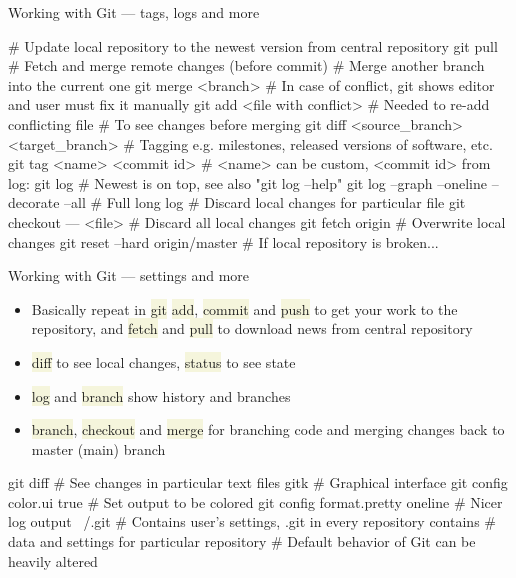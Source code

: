 \documentclass[compress, ucs, xelatex, 11pt, xcolor=svgnames, aspectratio=169,
	hyperref={
		bookmarks=true,
		unicode=true,
		colorlinks=true,
		pdftitle={Linux, command line and MetaCentrum},
		plainpages=false,
		pdfauthor={Vojtech Zeisek},
		pdfsubject={Course about use of Linux command line, writing shell scripts and using MetaCentrum of CESNET},
		pdfcreator={XeLaTeX},
		pdfkeywords={Linux, GNU, BASH, shell, command line, MetaCentrum},
		linkcolor=DarkRed, %
		anchorcolor=DarkBlue, %
		citecolor=Indigo, %
		filecolor=NavyBlue, %
		menucolor=DarkMagenta, %
		urlcolor=DarkBlue, %
		pdftex},
	url={hyphens, lowtilde} %
	]{beamer}
\renewcommand{\texttt}[1]{\colorbox{Beige}{{\ttfamily #1}}}
\begin{document}
\begin{frame}[fragile]{Working with Git --- tags, logs and more}
	\begin{bashcode}
    # Update local repository to the newest version from central repository
    git pull # Fetch and merge remote changes (before commit)
    # Merge another branch into the current one
    git merge <branch>
    # In case of conflict, git shows editor and user must fix it manually
    git add <file with conflict> # Needed to re-add conflicting file
    # To see changes before merging
    git diff <source_branch> <target_branch>
    # Tagging e.g. milestones, released versions of software, etc.
    git tag <name> <commit id> # <name> can be custom, <commit id> from log:
    git log # Newest is on top, see also "git log --help"
    git log --graph --oneline --decorate --all # Full long log
    # Discard local changes for particular file
    git checkout --- <file>
    # Discard all local changes
    git fetch origin # Overwrite local changes
    git reset --hard origin/master # If local repository is broken...
	\end{bashcode}
\end{frame}

\begin{frame}[fragile]{Working with Git --- settings and more}
	\begin{itemize}
		\item Basically repeat in \texttt{git} \texttt{add}, \texttt{commit} and \texttt{push} to get your work to the repository, and \texttt{fetch} and \texttt{pull} to download news from central repository
		\item \texttt{diff} to see local changes, \texttt{status} to see state
		\item \texttt{log} and \texttt{branch} show history and branches
		\item \texttt{branch}, \texttt{checkout} and \texttt{merge} for branching code and merging changes back to master (main) branch
	\end{itemize}
	\begin{bashcode}
    git diff # See changes in particular text files
    gitk # Graphical interface
    git config color.ui true # Set output to be colored
    git config format.pretty oneline # Nicer log output
    ~/.git # Contains user's settings, .git in every repository contains
           # data and settings for particular repository
           # Default behavior of Git can be heavily altered
	\end{bashcode}
\end{frame}
\end{document}
